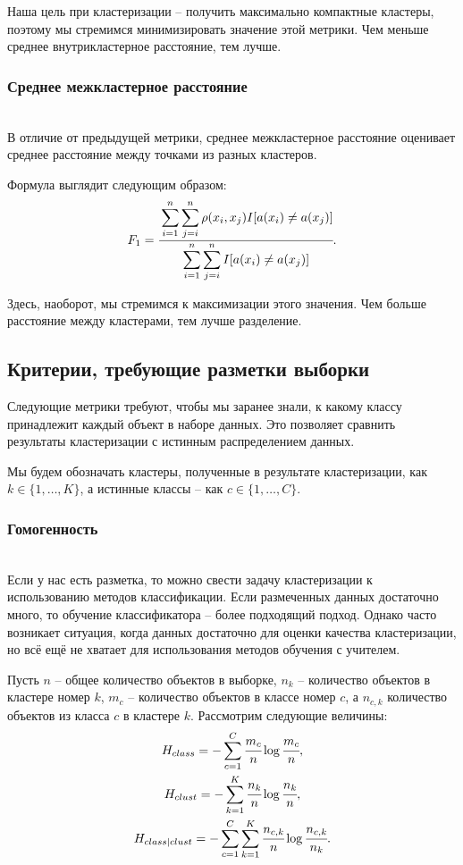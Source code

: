 Наша цель при кластеризации -- получить максимально компактные кластеры, поэтому мы стремимся минимизировать значение этой метрики.  Чем меньше среднее внутрикластерное расстояние, тем лучше.

\subsubsection{Среднее межкластерное расстояние} \hfill\\

В отличие от предыдущей метрики, среднее межкластерное расстояние оценивает среднее расстояние между точками из разных кластеров.  

Формула выглядит следующим образом:
\begin{equation*}
     F_1 = \cfrac{\displaystyle\sum_{i=1}^n \sum_{j=i}^n \rho(x_i,  x_j) I[a(  x_i)\ne a(x_j)]}{\displaystyle\sum_{i=1}^n \sum _ {j=i}^n I[ a(x_i)\ne a(x_j)]}.
\end{equation*}

Здесь, наоборот, мы стремимся к максимизации этого значения.  Чем больше расстояние между кластерами, тем лучше разделение.  

\subsection{Критерии, требующие разметки выборки}

Следующие метрики требуют, чтобы мы заранее знали, к какому классу принадлежит каждый объект в наборе данных.  Это позволяет сравнить результаты кластеризации с истинным распределением данных.

Мы будем обозначать кластеры, полученные в результате кластеризации, как $k \in \{1, \ldots, K\}$, а истинные классы -- как $c \in \{1, \ldots, C\}$.

\subsubsection{Гомогенность} \hfill\\

Если у нас есть разметка, то можно свести задачу кластеризации к использованию методов классификации. Если размеченных данных достаточно много, то обучение классификатора -- более подходящий подход. Однако часто возникает ситуация, когда данных достаточно для оценки качества кластеризации, но всё ещё не хватает для использования методов обучения с учителем.

Пусть $n$ -- общее количество объектов в выборке, $n_k$ -- количество объектов в кластере номер $k$, $m_c$ -- количество объектов в классе номер $c$, а $n_{c,k}$ количество объектов из класса $c$ в кластере $k$. Рассмотрим следующие величины:
\begin{gather*}
    H_{class} = -\displaystyle\sum_{c=1}^C \cfrac{m_c}{n} \log\cfrac{m_c}{n}, \\
    H_{clust} = -\displaystyle\sum_{k=1}^K \cfrac{n_k}{n} \log\cfrac{n_k}{n}, \\
    H_{class \vert clust} = -\displaystyle\sum_{c=1}^C \sum_{k=1}^K \cfrac{n_{c,k}}{n} \log\cfrac{n_{c,k}}{n_k}.
\end{gather*}

